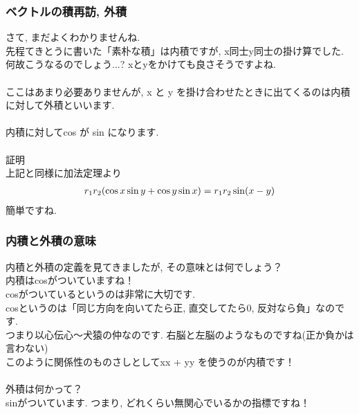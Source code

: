 \documentclass[11pt,a4paper]{jsarticle}
\begin{document}
\subsubsection{ベクトルの積再訪, 外積}
さて, まだよくわかりませんね. \\
先程てきとうに書いた「素朴な積」は内積ですが, x同士y同士の掛け算でした.\\
何故こうなるのでしょう...? xとyをかけても良さそうですよね.\\
\\
ここはあまり必要ありませんが, x と y を掛け合わせたときに出てくるのは内積に対して外積といいます.\\
\\
内積に対してcos が sin になります.
\\
\\
証明\\
上記と同様に加法定理より\\
\begin{eqnarray}
\mathstrut r_1\mathstrut r_2(\cos x\sin y + \cos y\sin x) = \mathstrut r_1\mathstrut r_2\sin (x-y)
\end{eqnarray}
簡単ですね.


\subsubsection{内積と外積の意味}
内積と外積の定義を見てきましたが, その意味とは何でしょう？\\
内積はcosがついていますね！\\
cosがついているというのは非常に大切です.\\
cosというのは「同じ方向を向いてたら正, 直交してたら0, 反対なら負」なのです.\\
つまり以心伝心～犬猿の仲なのです. 右脳と左脳のようなものですね(正か負かは言わない)\\
このように関係性のものさしとしてxx + yy を使うのが内積です！\\
\\
外積は何かって？\\
sinがついています. つまり, どれくらい無関心でいるかの指標ですね！
\end{document}
